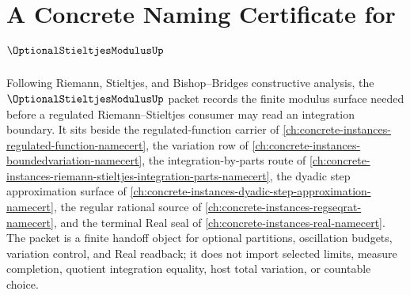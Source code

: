 \chapter{A Concrete Naming Certificate for $\OptionalStieltjesModulusUp$}
\label{ch:concrete-instances-optional-stieltjes-modulus-namecert}

Following Riemann, Stieltjes, and Bishop--Bridges constructive analysis, the $\OptionalStieltjesModulusUp$ packet records the finite modulus surface needed before a regulated Riemann--Stieltjes consumer may read an integration boundary. It sits beside the regulated-function carrier of \autoref{ch:concrete-instances-regulated-function-namecert}, the variation row of \autoref{ch:concrete-instances-boundedvariation-namecert}, the integration-by-parts route of \autoref{ch:concrete-instances-riemann-stieltjes-integration-parts-namecert}, the dyadic step approximation surface of \autoref{ch:concrete-instances-dyadic-step-approximation-namecert}, the regular rational source of \autoref{ch:concrete-instances-regseqrat-namecert}, and the terminal Real seal of \autoref{ch:concrete-instances-real-namecert}. The packet is a finite handoff object for optional partitions, oscillation budgets, variation control, and Real readback; it does not import selected limits, measure completion, quotient integration equality, host total variation, or countable choice.

